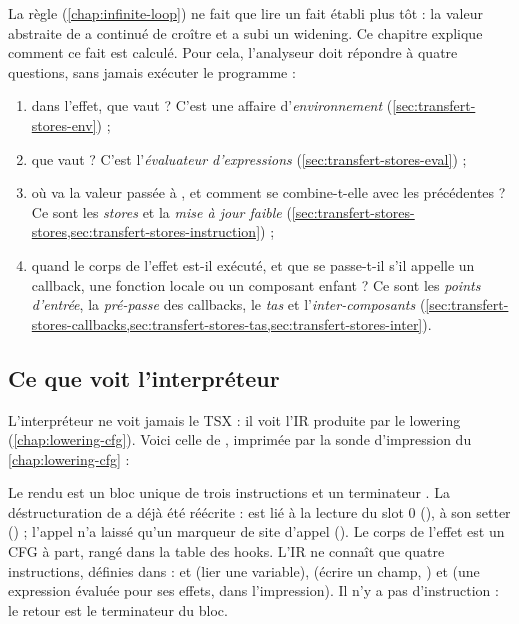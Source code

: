La règle  (\cref{chap:infinite-loop}) ne fait que lire
un fait établi plus tôt : \og la valeur abstraite de  a continué de
croître et a subi un widening\fg{}. Ce chapitre explique comment ce fait est
calculé. Pour cela, l'analyseur doit répondre à quatre questions, sans jamais
exécuter le programme :
\begin{enumerate}
  \item dans l'effet, que vaut  ? C'est une affaire
    d'\emph{environnement} (\cref{sec:transfert-stores-env}) ;
  \item que vaut  ? C'est l'\emph{évaluateur d'expressions}
    (\cref{sec:transfert-stores-eval}) ;
  \item où va la valeur passée à , et comment se combine-t-elle
    avec les précédentes ? Ce sont les \emph{stores} et la \emph{mise à jour
    faible} (\cref{sec:transfert-stores-stores,sec:transfert-stores-instruction}) ;
  \item quand le corps de l'effet est-il exécuté, et que se passe-t-il s'il
    appelle un callback, une fonction locale ou un composant enfant ? Ce sont
    les \emph{points d'entrée}, la \emph{pré-passe} des callbacks, le
    \emph{tas} et l'\emph{inter-composants}
    (\cref{sec:transfert-stores-callbacks,sec:transfert-stores-tas,sec:transfert-stores-inter}).
\end{enumerate}

\subsection{Ce que voit l'interpréteur}

L'interpréteur ne voit jamais le TSX : il voit l'IR produite par le lowering
(\cref{chap:lowering-cfg}). Voici celle de , imprimée par la
sonde d'impression du \cref{chap:lowering-cfg} :


Le rendu est un bloc unique de trois instructions et un terminateur
. La déstructuration de  a déjà été réécrite :
 est lié à la lecture du slot $0$ (), 
à son setter () ; l'appel  n'a laissé
qu'un marqueur de site d'appel (). Le corps de l'effet est
un CFG à part, rangé dans la table des hooks. L'IR ne connaît que quatre
instructions, définies dans  :  et
 (lier une variable),  (écrire un champ,
) et  (une expression évaluée pour ses
effets,  dans l'impression). Il n'y a pas d'instruction
 : le retour est le terminateur du bloc.

